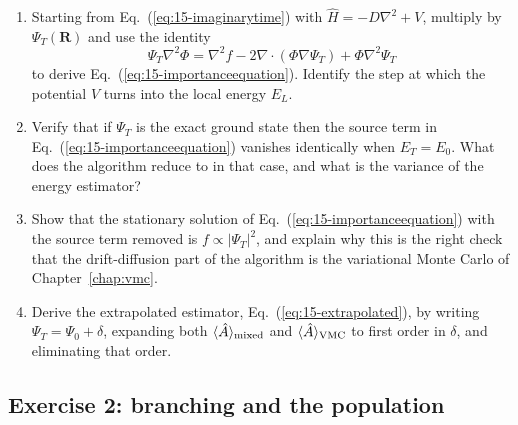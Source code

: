 \begin{enumerate}
\item[a)] Starting from Eq.~(\ref{eq:15-imaginarytime}) with
  $\hat{H}=-D\nabla^2+V$, multiply by $\Psi_T(\bm{R})$ and use the identity
  \begin{equation*}
    \Psi_T\nabla^2\Phi
     = \nabla^2 f - 2\nabla\!\cdot\!\left(\Phi\nabla\Psi_T\right)
     + \Phi\nabla^2\Psi_T
  \end{equation*}
  to derive Eq.~(\ref{eq:15-importanceequation}).  Identify the step at which
  the potential $V$ turns into the local energy $E_L$.

\item[b)] Verify that if $\Psi_T$ is the exact ground state then the source
  term in Eq.~(\ref{eq:15-importanceequation}) vanishes identically when
  $E_T=E_0$.  What does the algorithm reduce to in that case, and what is the
  variance of the energy estimator?

\item[c)] Show that the stationary solution of
  Eq.~(\ref{eq:15-importanceequation}) with the source term removed is
  $f\propto|\Psi_T|^2$, and explain why this is the right check that the
  drift-diffusion part of the algorithm is the variational Monte Carlo of
  Chapter~\ref{chap:vmc}.

\item[d)] Derive the extrapolated estimator, Eq.~(\ref{eq:15-extrapolated}),
  by writing $\Psi_T=\Psi_0+\delta$, expanding both
  $\langle \hat{A} \rangle_{\mathrm{mixed}}$ and $\langle \hat{A} \rangle_{\mathrm{VMC}}$ to
  first order in $\delta$, and eliminating that order.
\end{enumerate}

\subsection*{Exercise 2: branching and the population}
\label{ex:15-branching}

